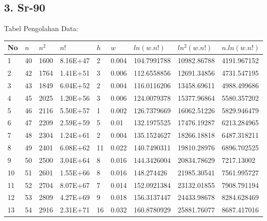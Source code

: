 \documentclass{article}
\begin{document}
			\subsection*{3. Sr-90}
			Tabel Pengolahan Data:
			\begin{longtable}{@{}lllllllll@{}}
				\toprule
				No  & $n$  & $n^{2}$ & $n!$   & $h$   & $w$     & $ln(w.n!)$     & $ln^{2}(w.n!)$ & $n.ln(w.n!)$   \\ \midrule
				\endfirsthead
				\endhead
				\bottomrule
				\endfoot
				\endlastfoot
				1   & 40   & 1600                 & 8.16E+47    & 2   & 0.004 & 104.7991788 & 10982.86788                 & 4191.967152 \\
				2   & 42   & 1764                 & 1.41E+51    & 3   & 0.006 & 112.6558856 & 12691.34856                 & 4731.547195 \\
				3   & 43   & 1849                 & 6.04E+52    & 2   & 0.004 & 116.0116206 & 13458.69611                 & 4988.499686 \\
				4   & 45   & 2025                 & 1.20E+56    & 3   & 0.006 & 124.0079378 & 15377.96864                 & 5580.357202 \\
				5   & 46   & 2116                 & 5.50E+57    & 1   & 0.002 & 126.7379669 & 16062.51226                 & 5829.946479 \\
				6   & 47   & 2209                 & 2.59E+59    & 5   & 0.01  & 132.1975525 & 17476.19287                 & 6213.284965 \\
				7   & 48   & 2304                 & 1.24E+61    & 2   & 0.004 & 135.1524627 & 18266.18818                 & 6487.318211 \\
				8   & 49   & 2401                 & 6.08E+62    & 11  & 0.022 & 140.7490311 & 19810.28976                 & 6896.702525 \\
				9   & 50   & 2500                 & 3.04E+64    & 8   & 0.016 & 144.3426004 & 20834.78629                 & 7217.13002  \\
				10  & 51   & 2601                 & 1.55E+66    & 8   & 0.016 & 148.274426  & 21985.30541                 & 7561.995727 \\
				11  & 52   & 2704                 & 8.07E+67    & 7   & 0.014 & 152.0921384 & 23132.01855                 & 7908.791194 \\
				12  & 53   & 2809                 & 4.27E+69    & 9   & 0.018 & 156.3137447 & 24433.98678                 & 8284.628469 \\
				13  & 54   & 2916                 & 2.31E+71    & 16  & 0.032 & 160.8780929 & 25881.76077                 & 8687.417016 \\

\end{longtable}
\end{document}
